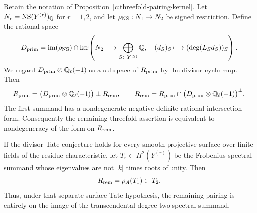 \begin{corollary}
\label{c:threefold-divisor-split}
Retain the notation of Proposition~\ref{c:threefold-pairing-kernel}.
Let $N_r=\operatorname{NS}(Y^{(r)})_\mathbb Q$ for $r=1,2$,
and let $\rho_{\rm NS}:N_1\to N_2$ be signed restriction.
Define the rational space
\[
 D_{\rm prim}=
 \operatorname{im}(\rho_{\rm NS})\cap
 \ker\!\left(
 N_2\longrightarrow
 \bigoplus_{S\subset Y^{(2)}}\mathbb Q,\quad
 (d_S)_S\longmapsto(\deg(L_Sd_S))_S
 \right).
\]
We regard $D_{\rm prim}\otimes\mathbb Q_\ell(-1)$ as a subspace of
$R_{\rm prim}$ by the divisor cycle map.  Then
\[
 R_{\rm prim}
 =\bigl(D_{\rm prim}\otimes\mathbb Q_\ell(-1)\bigr)
   \mathbin{\perp}R_{\rm rem},
 \qquad
 R_{\rm rem}=
 R_{\rm prim}\cap
       \bigl(D_{\rm prim}\otimes\mathbb Q_\ell(-1)\bigr)^\perp .
\]
The first summand has a nondegenerate negative-definite
rational intersection form.  Consequently the remaining
threefold assertion is equivalent to nondegeneracy of the
form on $R_{\rm rem}$.

If the divisor Tate conjecture holds for every smooth
projective surface over finite fields of the residue
characteristic, let
$T_r\subset H^2(Y^{(r)})$ be the Frobenius spectral summand
whose eigenvalues are not $|k|$ times roots of unity.
Then
\[
 R_{\rm rem}=\rho_A(T_1)\subset T_2.
\]
Thus, under that separate surface-Tate hypothesis, the
remaining pairing is entirely on the image of the
transcendental degree-two spectral summand.
\end{corollary}

